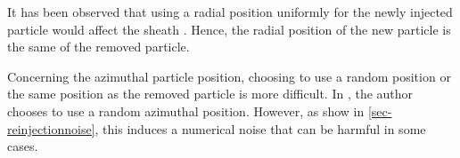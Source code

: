 It has been observed that using a radial position uniformly for the newly injected particle would affect the sheath \citep{croes2017a}.
Hence, the radial position of the new particle is the same of the removed particle.

Concerning the azimuthal particle position, choosing to use a random position or the same position as the removed particle is more difficult.
In \citet{lafleur2016a,croes2017a}, the author chooses to use a random azimuthal position.
However, as show in \cref{sec-reinjectionnoise}, this induces a numerical noise that can be harmful in some cases.
